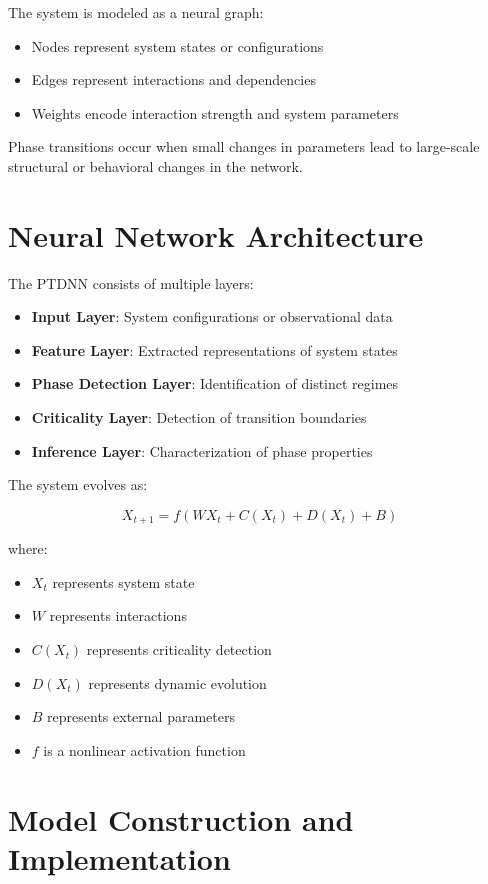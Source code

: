 \documentclass[12pt]{article}
\begin{document}
The system is modeled as a neural graph:

\begin{itemize}
\item Nodes represent system states or configurations
\item Edges represent interactions and dependencies
\item Weights encode interaction strength and system parameters
\end{itemize}

Phase transitions occur when small changes in parameters lead to large-scale structural or behavioral changes in the network.

\section{Neural Network Architecture}

The PTDNN consists of multiple layers:

\begin{itemize}
\item \textbf{Input Layer}: System configurations or observational data
\item \textbf{Feature Layer}: Extracted representations of system states
\item \textbf{Phase Detection Layer}: Identification of distinct regimes
\item \textbf{Criticality Layer}: Detection of transition boundaries
\item \textbf{Inference Layer}: Characterization of phase properties
\end{itemize}

The system evolves as:

\[
X_{t+1} = f(WX_t + C(X_t) + D(X_t) + B)
\]

where:
\begin{itemize}
\item $X_t$ represents system state
\item $W$ represents interactions
\item $C(X_t)$ represents criticality detection
\item $D(X_t)$ represents dynamic evolution
\item $B$ represents external parameters
\item $f$ is a nonlinear activation function
\end{itemize}

\section{Model Construction and Implementation}
\end{document}
